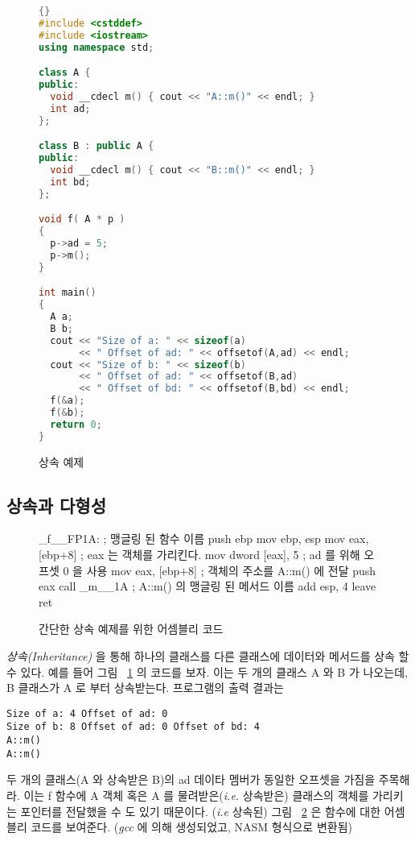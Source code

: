 
\begin{figure}[tp]
\begin{lstlisting}[language=C++, frame=tlrb]{}
#include <cstddef>
#include <iostream>
using namespace std;

class A {
public:
  void __cdecl m() { cout << "A::m()" << endl; }
  int ad;
};

class B : public A {
public:
  void __cdecl m() { cout << "B::m()" << endl; }
  int bd;
};

void f( A * p )
{
  p->ad = 5;
  p->m();
}

int main()
{
  A a;
  B b;
  cout << "Size of a: " << sizeof(a)
       << " Offset of ad: " << offsetof(A,ad) << endl;
  cout << "Size of b: " << sizeof(b)
       << " Offset of ad: " << offsetof(B,ad)
       << " Offset of bd: " << offsetof(B,bd) << endl;
  f(&a);
  f(&b);
  return 0;
}
\end{lstlisting}
\caption{상속 예제 \label{fig:SimpInh}}
\end{figure}


\subsection{상속과 다형성}


\begin{figure}[tp]
\begin{AsmCodeListing}
_f__FP1A:                       ; 맹글링 된 함수 이름 
      push   ebp
      mov    ebp, esp
      mov    eax, [ebp+8]       ; eax 는 객체를 가리킨다. 
      mov    dword [eax], 5     ; ad 를 위해 오프셋 0 을 사용 
      mov    eax, [ebp+8]       ; 객체의 주소를 A::m() 에 전달
      push   eax
      call   _m__1A             ; A::m() 의 맹글링 된 메서드 이름 
      add    esp, 4
      leave
      ret
\end{AsmCodeListing}
\caption{간단한 상속 예제를 위한 어셈블리 코드 \label{fig:FAsm1}}
\end{figure}

\emph{상속(Inheritance)} 을 통해 하나의 클래스를 다른 클래스에 데이터와 메서드를
상속 할 수 있다. 예를 들어 그림 ~\ref{fig:SimpInh} 의 코드를 보자. 이는 두 개의 클래스
{\code A} 와 {\code B} 가 나오는데, {\code B} 클래스가 {\code A} 로 부터 상속받는다.
프로그램의 출력 결과는 

\begin{verbatim}
Size of a: 4 Offset of ad: 0
Size of b: 8 Offset of ad: 0 Offset of bd: 4
A::m()
A::m()
\end{verbatim}
두 개의 클래스({\code A} 와 상속받은 {\code B})의 {\code ad} 데이타 멤버가 
동일한 오프셋을 가짐을 주목해라. 이는 {\code f} 함수에 {\code A} 객체 혹은
{\code A} 를 물려받은(\emph{i.e.} 상속받은) 클래스의 객체를 가리키는 포인터를 전달했을 수 도 있기 때문이다. (\emph{i.e} 상속된)
그림 ~\ref{fig:FAsm1} 은 함수에 대한 어셈블리 코드를 보여준다. (\emph{gcc} 에 의해 생성되었고, NASM 형식으로 변환됨)

